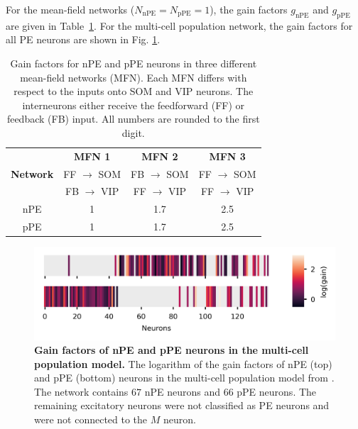 \documentclass[10pt,a4paper]{article}
\begin{document}
For the mean-field networks ($ N_\mathrm{nPE} = N_\mathrm{pPE} = 1 $), the gain factors $g_\mathrm{nPE}$ and $g_\mathrm{pPE}$ are given in Table~\ref{tab:gain_factors_MFN}. For the multi-cell population network, the gain factors for all PE neurons are shown in Fig. \ref{fig:Fig_gains}. 
%
\begin{table}[h!]
\centering
\begin{tabular}{ |c|c|c|c| }
\hline
 & \textbf{MFN 1} & \textbf{MFN 2} & \textbf{MFN 3}  \\
\textbf{Network} & FF $\rightarrow$ SOM  & FB $\rightarrow$ SOM  & FF $\rightarrow$ SOM  \\
 & FB $\rightarrow$ VIP  & FF $\rightarrow$ VIP  & FF $\rightarrow$ VIP  \\
\hline
\hline
nPE & 1 & 1.7 & 2.5\\
pPE & 1 & 1.7 & 2.5 \\
\hline
\end{tabular}
\caption{\footnotesize{Gain factors for nPE and pPE neurons in three different mean-field networks (MFN). Each MFN differs with respect to the inputs onto SOM and VIP neurons. The interneurons either receive the feedforward (FF) or feedback (FB) input. All numbers are rounded to the first digit.}}
\label{tab:gain_factors_MFN}
\end{table}
%
%
\begin{figure}[h!]
	\centering
    \includegraphics{../results/figures/final/Figure_gains}
\caption{\footnotesize{\bf Gain factors of nPE and pPE neurons in the multi-cell population model.\newline}
{The logarithm of the gain factors of nPE (top) and pPE (bottom) neurons in the multi-cell population model from \citep{hertag2022prediction}. The network contains $67$ nPE neurons and $66$ pPE neurons. The remaining excitatory neurons were not classified as PE neurons and were not connected to the $M$ neuron.}}
\label{fig:Fig_gains}
\end{figure}
%
%
\end{document}
